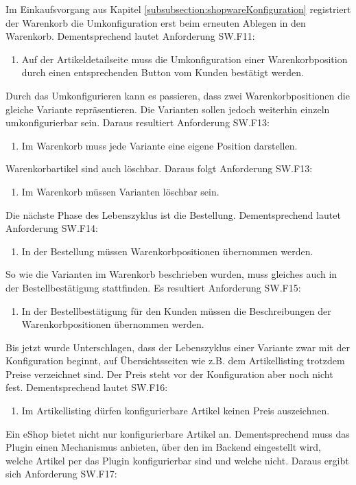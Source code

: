 \documentclass[12pt,a4paper,bibliography=totocnumbered,listof=totoc]{scrartcl}
\begin{document}
Im Einkaufsvorgang aus Kapitel \ref{subsubsection:shopwareKonfiguration} registriert der Warenkorb die Umkonfiguration erst beim erneuten Ablegen in den Warenkorb. Dementsprechend lautet Anforderung SW.F11:
\begin{enumerate}[SW.F11:]\bfseries
\item Auf der Artikeldetailseite muss die Umkonfiguration einer Warenkorbposition durch einen entsprechenden Button vom Kunden bestätigt werden.
\end{enumerate}
Durch das Umkonfigurieren kann es passieren, dass zwei Warenkorbpositionen die gleiche Variante repräsentieren. Die Varianten sollen jedoch weiterhin einzeln umkonfigurierbar sein. Daraus resultiert Anforderung SW.F13:
\begin{enumerate}[SW.F13:]\bfseries
\item Im Warenkorb muss jede Variante eine eigene Position darstellen.
\end{enumerate}
Warenkorbartikel sind auch löschbar. Daraus folgt Anforderung SW.F13:
\begin{enumerate}[SW.F13:]\bfseries
\item Im Warenkorb müssen Varianten löschbar sein.
\end{enumerate}
Die nächste Phase des Lebenszyklus ist die Bestellung. Dementsprechend lautet Anforderung SW.F14:
\begin{enumerate}[SW.F14:]\bfseries
\item In der Bestellung müssen Warenkorbpositionen übernommen werden.
\end{enumerate}
So wie die Varianten im Warenkorb beschrieben wurden, muss gleiches auch in der Bestellbestätigung stattfinden. Es resultiert Anforderung SW.F15:
\begin{enumerate}[SW.F15:]\bfseries
\item In der Bestellbestätigung für den Kunden müssen die Beschreibungen der Warenkorbpositionen übernommen werden.
\end{enumerate}
Bis jetzt wurde Unterschlagen, dass der Lebenszyklus einer Variante zwar mit der Konfiguration beginnt, auf Übersichtsseiten wie z.B. dem Artikellisting trotzdem Preise verzeichnet sind. Der Preis steht vor der Konfiguration aber noch nicht fest. Dementsprechend lautet SW.F16:
\begin{enumerate}[SW.F16:]\bfseries
\item Im Artikellisting dürfen konfigurierbare Artikel keinen Preis auszeichnen.
\end{enumerate}
Ein eShop bietet nicht nur konfigurierbare Artikel an. Dementsprechend muss das Plugin einen Mechanismus anbieten, über den im Backend eingestellt wird, welche Artikel per das Plugin konfigurierbar sind und welche nicht. Daraus ergibt sich Anforderung SW.F17:
\end{document}
